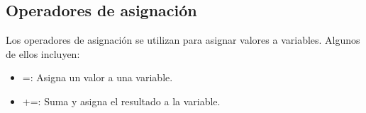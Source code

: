 \subsection{Operadores de asignación}
Los operadores de asignación se utilizan para asignar valores a variables. Algunos de ellos incluyen:
\begin{itemize}
    \item =: Asigna un valor a una variable.
    \begin{figure}[h]
      \centering
    \end{figure}
\newpage
    \item +=: Suma y asigna el resultado a la variable.
    \begin{figure}[h]
      \centering
    \end{figure}


\end{itemize}
